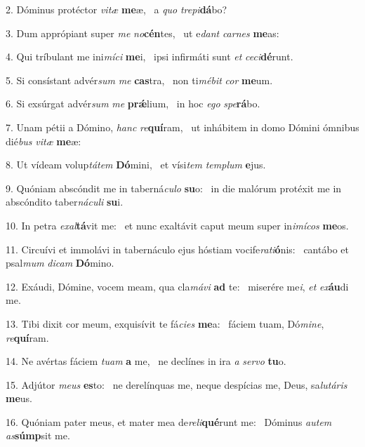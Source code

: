 2. Dóminus protéctor \textit{vi}\textit{tæ} \textbf{me}æ, \ast\  a \textit{quo} \textit{tre}\textit{pi}\textbf{dá}bo?\

3. Dum apprópiant super \textit{me} \textit{no}\textbf{cén}tes, \ast\  ut e\textit{dant} \textit{car}\textit{nes} \textbf{me}as:\

4. Qui tríbulant me ini\textit{mí}\textit{ci} \textbf{me}i, \ast\  ipsi infirmáti sunt \textit{et} \textit{ce}\textit{ci}\textbf{dé}runt.\

5. Si consístant advér\textit{sum} \textit{me} \textbf{cas}tra, \ast\  non ti\textit{mé}\textit{bit} \textit{cor} \textbf{me}um.\

6. Si exsúrgat advér\textit{sum} \textit{me} \textbf{prǽ}lium, \ast\  in hoc \textit{e}\textit{go} \textit{spe}\textbf{rá}bo.\

7. Unam pétii a Dómino, \textit{hanc} \textit{re}\textbf{quí}ram, \ast\  ut inhábitem in domo Dómini ómnibus dié\textit{bus} \textit{vi}\textit{tæ} \textbf{me}æ:\

8. Ut vídeam volup\textit{tá}\textit{tem} \textbf{Dó}mini, \ast\  et vísi\textit{tem} \textit{tem}\textit{plum} \textbf{e}jus.\

9. Quóniam abscóndit me in taberná\textit{cu}\textit{lo} \textbf{su}o: \ast\  in die malórum protéxit me in abscóndito taber\textit{ná}\textit{cu}\textit{li} \textbf{su}i.\

10. In petra \textit{ex}\textit{al}\textbf{tá}vit me: \ast\  et nunc exaltávit caput meum super in\textit{i}\textit{mí}\textit{cos} \textbf{me}os.\

11. Circuívi et immolávi in tabernáculo ejus hóstiam vocife\textit{ra}\textit{ti}\textbf{ó}nis: \ast\  cantábo et psal\textit{mum} \textit{di}\textit{cam} \textbf{Dó}mino.\

12. Exáudi, Dómine, vocem meam, qua cla\textit{má}\textit{vi} \textbf{ad} te: \ast\  miserére me\textit{i}, \textit{et} \textit{ex}\textbf{áu}di me.\

13. Tibi dixit cor meum, exquisívit te fá\textit{ci}\textit{es} \textbf{me}a: \ast\  fáciem tuam, Dó\textit{mi}\textit{ne}, \textit{re}\textbf{quí}ram.\

14. Ne avértas fáciem \textit{tu}\textit{am} \textbf{a} me, \ast\  ne declínes in ira \textit{a} \textit{ser}\textit{vo} \textbf{tu}o.\

15. Adjútor \textit{me}\textit{us} \textbf{es}to: \ast\  ne derelínquas me, neque despícias me, Deus, sa\textit{lu}\textit{tá}\textit{ris} \textbf{me}us.\

16. Quóniam pater meus, et mater mea de\textit{re}\textit{li}\textbf{qué}runt me: \ast\  Dóminus \textit{au}\textit{tem} \textit{as}\textbf{súmp}sit me.\

